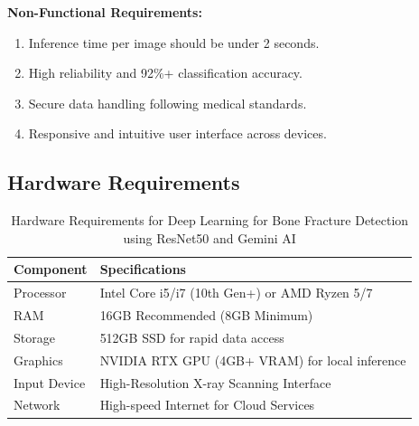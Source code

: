 \documentclass[a4paper,12pt]{report}
\begin{document}
    \textbf{Non-Functional Requirements:}
    \begin{enumerate}
        \item Inference time per image should be under 2 seconds.
        \item High reliability and 92\%+ classification accuracy.
        \item Secure data handling following medical standards.
        \item Responsive and intuitive user interface across devices.
    \end{enumerate}

    \subsection{Hardware Requirements}
    \begin{table}[H]
    \centering
    \begin{tabular}{|l|l|}
    \hline
    \textbf{Component} & \textbf{Specifications} \\ \hline
    Processor & Intel Core i5/i7 (10th Gen+) or AMD Ryzen 5/7 \\ \hline
    RAM & 16GB Recommended (8GB Minimum) \\ \hline
    Storage & 512GB SSD for rapid data access \\ \hline
    Graphics & NVIDIA RTX GPU (4GB+ VRAM) for local inference \\ \hline
    Input Device & High-Resolution X-ray Scanning Interface \\ \hline
    Network & High-speed Internet for Cloud Services \\ \hline
    \end{tabular}
    \caption{Hardware Requirements for Deep Learning for Bone Fracture Detection using ResNet50 and Gemini AI}
    \end{table}
\end{document}
